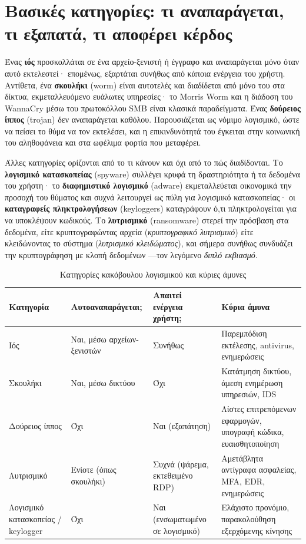 \section{Βασικές κατηγορίες: τι αναπαράγεται, τι εξαπατά, τι αποφέρει κέρδος}\label{sec:4.1}
Ένας \textbf{ιός} προσκολλάται σε ένα αρχείο-ξενιστή ή έγγραφο και αναπαράγεται μόνο όταν αυτό εκτελεστεί· επομένως, εξαρτάται συνήθως από κάποια ενέργεια του χρήστη. Αντίθετα, ένα \textbf{σκουλήκι} (worm) είναι αυτοτελές και διαδίδεται από μόνο του στα δίκτυα, εκμεταλλευόμενο ευάλωτες υπηρεσίες· το Morris Worm και η διάδοση του WannaCry μέσω του πρωτοκόλλου SMB είναι κλασικά παραδείγματα. Ένας \textbf{δούρειος ίππος} (trojan) δεν αναπαράγεται καθόλου. Παρουσιάζεται ως νόμιμο λογισμικό, ώστε να πείσει το θύμα να τον εκτελέσει, και η επικινδυνότητά του έγκειται στην κοινωνική του αληθοφάνεια και στα ωφέλιμα φορτία που μεταφέρει.

Άλλες κατηγορίες ορίζονται από το τι κάνουν και όχι από το πώς διαδίδονται. Το \textbf{λογισμικό κατασκοπείας} (spyware) συλλέγει κρυφά τη δραστηριότητα ή τα δεδομένα του χρήστη· το \textbf{διαφημιστικό λογισμικό} (adware) εκμεταλλεύεται οικονομικά την προσοχή του θύματος και συχνά λειτουργεί ως πύλη για λογισμικό κατασκοπείας· οι \textbf{καταγραφείς πληκτρολογήσεων} (keyloggers) καταγράφουν ό,τι πληκτρολογείται για να υποκλέψουν κωδικούς. Το \textbf{λυτρισμικό} (ransomware) στερεί την πρόσβαση στα δεδομένα, είτε κρυπτογραφώντας αρχεία (\emph{κρυπτογραφικό λυτρισμικό}) είτε κλειδώνοντας το σύστημα (\emph{λυτρισμικό κλειδώματος}), και σήμερα συνήθως συνδυάζει την κρυπτογράφηση με κλοπή δεδομένων —τον λεγόμενο \emph{διπλό εκβιασμό}.

\begin{table}[htbp]
  \centering\small
  \caption{Κατηγορίες κακόβουλου λογισμικού και κύριες άμυνες}
  \begin{tabularx}{\linewidth}{>{\raggedright\arraybackslash}X >{\raggedright\arraybackslash}X >{\raggedright\arraybackslash}X >{\raggedright\arraybackslash}X}
    \toprule
    \textbf{Κατηγορία} & \textbf{Αυτοαναπαράγεται;} & \textbf{Απαιτεί ενέργεια χρήστη;} & \textbf{Κύρια άμυνα} \\
    \midrule
    Ιός & Ναι, μέσω αρχείων-ξενιστών & Συνήθως & Παρεμπόδιση εκτέλεσης, antivirus, ενημερώσεις \\
    Σκουλήκι & Ναι, μέσω δικτύου & Όχι & Κατάτμηση δικτύου, άμεση ενημέρωση υπηρεσιών, IDS \\
    Δούρειος ίππος & Όχι & Ναι (εξαπάτηση) & Λίστες επιτρεπόμενων εφαρμογών, υπογραφή κώδικα, ευαισθητοποίηση \\
    Λυτρισμικό & Ενίοτε (όπως σκουλήκι) & Συχνά (ψάρεμα, εκτεθειμένο RDP) & Αμετάβλητα αντίγραφα ασφαλείας, MFA, EDR, ενημερώσεις \\
    Λογισμικό κατασκοπείας / keylogger & Όχι & Ναι (ενσωματωμένο σε λογισμικό) & Ελάχιστο προνόμιο, παρακολούθηση εξερχόμενης κίνησης \\
    \bottomrule
  \end{tabularx}
\end{table}
